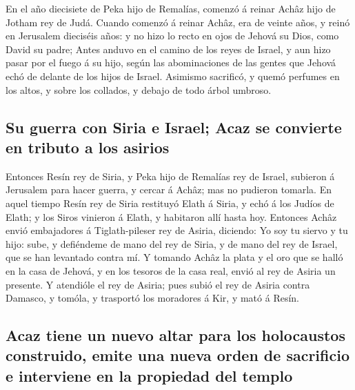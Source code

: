  En el año diecisiete de Peka hijo de Remalías, comenzó á
reinar Achâz hijo de Jotham rey de Judá.  Cuando comenzó á
reinar Achâz, era de veinte años, y reinó en Jerusalem dieciséis años: y
no hizo lo recto en ojos de Jehová su Dios, como David su padre;
 Antes anduvo en el camino de los reyes de Israel, y aun
hizo pasar por el fuego á su hijo, según las abominaciones de las gentes
que Jehová echó de delante de los hijos de Israel.  Asimismo
sacrificó, y quemó perfumes en los altos, y sobre los collados, y debajo
de todo árbol umbroso.

\hypertarget{su-guerra-con-siria-e-israel-acaz-se-convierte-en-tributo-a-los-asirios}{%
\subsection{Su guerra con Siria e Israel; Acaz se convierte en tributo a
los
asirios}\label{su-guerra-con-siria-e-israel-acaz-se-convierte-en-tributo-a-los-asirios}}

 Entonces Resín rey de Siria, y Peka hijo de Remalías rey de
Israel, subieron á Jerusalem para hacer guerra, y cercar á Achâz; mas no
pudieron tomarla.  En aquel tiempo Resín rey de Siria
restituyó Elath á Siria, y echó á los Judíos de Elath; y los Siros
vinieron á Elath, y habitaron allí hasta hoy.  Entonces
Achâz envió embajadores á Tiglath-pileser rey de Asiria, diciendo: Yo
soy tu siervo y tu hijo: sube, y defiéndeme de mano del rey de Siria, y
de mano del rey de Israel, que se han levantado contra mí. 
Y tomando Achâz la plata y el oro que se halló en la casa de Jehová, y
en los tesoros de la casa real, envió al rey de Asiria un presente.
 Y atendióle el rey de Asiria; pues subió el rey de Asiria
contra Damasco, y tomóla, y trasportó los moradores á Kir, y mató á
Resín.

\hypertarget{acaz-tiene-un-nuevo-altar-para-los-holocaustos-construido-emite-una-nueva-orden-de-sacrificio-e-interviene-en-la-propiedad-del-templo}{%
\subsection{Acaz tiene un nuevo altar para los holocaustos construido,
emite una nueva orden de sacrificio e interviene en la propiedad del
templo}\label{acaz-tiene-un-nuevo-altar-para-los-holocaustos-construido-emite-una-nueva-orden-de-sacrificio-e-interviene-en-la-propiedad-del-templo}}

